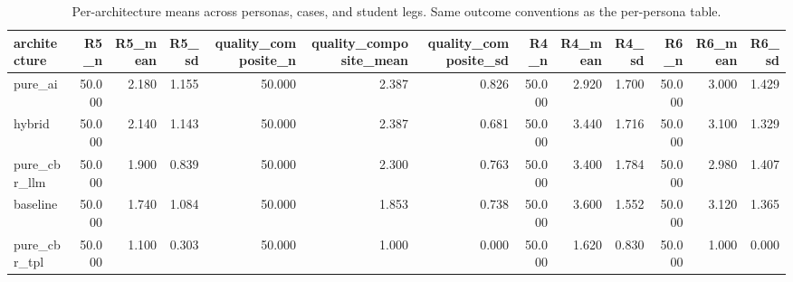 \begin{table}[htbp]
\centering
\caption{Per-architecture means across personas, cases, and student legs. Same outcome conventions as the per-persona table.}
\label{tab:per-arch-means}
\begin{tabular}{lrrrrrrrrrrrr}
\toprule
architecture & R5\_n & R5\_mean & R5\_sd & quality\_composite\_n & quality\_composite\_mean & quality\_composite\_sd & R4\_n & R4\_mean & R4\_sd & R6\_n & R6\_mean & R6\_sd \\
\midrule
pure\_ai & 50.000 & 2.180 & 1.155 & 50.000 & 2.387 & 0.826 & 50.000 & 2.920 & 1.700 & 50.000 & 3.000 & 1.429 \\
hybrid & 50.000 & 2.140 & 1.143 & 50.000 & 2.387 & 0.681 & 50.000 & 3.440 & 1.716 & 50.000 & 3.100 & 1.329 \\
pure\_cbr\_llm & 50.000 & 1.900 & 0.839 & 50.000 & 2.300 & 0.763 & 50.000 & 3.400 & 1.784 & 50.000 & 2.980 & 1.407 \\
baseline & 50.000 & 1.740 & 1.084 & 50.000 & 1.853 & 0.738 & 50.000 & 3.600 & 1.552 & 50.000 & 3.120 & 1.365 \\
pure\_cbr\_tpl & 50.000 & 1.100 & 0.303 & 50.000 & 1.000 & 0.000 & 50.000 & 1.620 & 0.830 & 50.000 & 1.000 & 0.000 \\
\bottomrule
\end{tabular}
\end{table}
